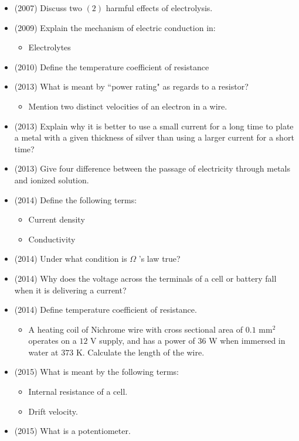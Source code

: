 \documentclass{article}
\begin{document}
\begin{itemize}
\item (2007)  Discuss two $ (2)$ harmful effects of electrolysis. 
\item (2009)  Explain the mechanism of electric conduction in:\begin{itemize}
\item Electrolytes
\end{itemize}
\item (2010)  Define the temperature coefficient of resistance
\item (2013)  What is meant by “power rating" as regards to a resistor?\begin{itemize}
\item Mention two distinct velocities of an electron in a wire.
\end{itemize}
\item (2013)  Explain why it is better to use a small current for a long time to plate a metal with a given thickness of silver than using a larger current for a short time? 
\item (2013)  Give four difference between the passage of electricity through metals and  ionized solution.
\item (2014)  Define the following terms:\begin{itemize}
\item Current density
\item Conductivity 
\end{itemize}
\item (2014)  Under what condition is $ \Omega $ ’s law true?
\item (2014)  Why does the voltage across the terminals of a cell or battery fall when it is delivering a current? 
\item (2014)  Define temperature coefficient of resistance.\begin{itemize}
\item A heating coil of Nichrome wire with cross sectional area of $ 0.1 $ mm$ ^{2}$ operates on a $ 12$ V supply, and has a power of $ 36$ W when immersed in water at $ 373$ K. Calculate the length of the wire.
\end{itemize}
\item (2015)  What is meant by the following terms:\begin{itemize}
\item  Internal resistance of a cell. 
\item  Drift velocity. 
\end{itemize}
\item (2015)  What is a potentiometer. \begin{itemize}

\end{itemize}
\end{itemize}
\end{document}
